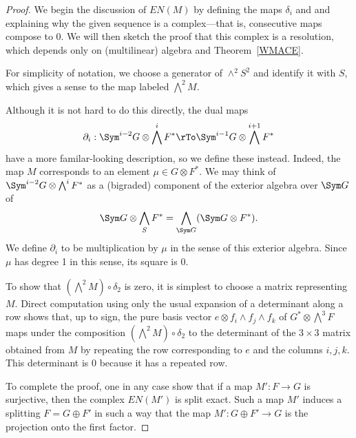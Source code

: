 \begin{proof} We begin the discussion of $EN(M)$ by defining the maps $\delta_i$ and and explaining why the given sequence is  a complex---that is, consecutive maps compose to 0. We will then sketch the proof that this complex is a resolution,
which depends only on (multilinear) algebra and Theorem~\ref{WMACE}. 

For simplicity of notation, we choose a generator of $\wedge^2 S^2$
 and identify it with $S$, which gives a sense to the map labeled $\bigwedge^2M$.
 
  Although it is not hard to do this directly, the dual maps
 $$
 \partial_i: \Sym^{i-2} G \otimes \bigwedge^i F^* \rTo \Sym^{i-1} G \otimes \bigwedge^{i+1} F^*
 $$
 have a more familar-looking description, so we define these instead. Indeed, the map $M$ corresponds to an
 element $\mu\in G\otimes F^*$. We may think of $ \Sym^{i-2} G \otimes \bigwedge^i  F^*$
 as a (bigraded) component of the exterior algebra over $ \Sym G$ of 
 $$
  \Sym G \otimes \bigwedge_S  F^*= \bigwedge_{ \Sym G} (\Sym G \otimes  F^*).
 $$
We define $\partial_i$ to be  multiplication by $\mu$ in the sense of this exterior algebra. Since $\mu$ has degree 1
in this sense, its square is 0. 

To show that $(\bigwedge^2 M)\circ \delta_2$ is zero, it is simplest to choose a matrix representing $M$.
Direct computation using only the usual expansion of a determinant
along a row shows that, up to sign, the
pure basis vector $e\otimes f_i\wedge f_j\wedge f_k$ of $G^*\otimes \bigwedge^3 F$
maps under the composition $(\bigwedge^2 M)\circ \delta_2$ to the determinant
of the $3\times 3$ matrix obtained from $M$ by repeating the row corresponding to $e$ and
the columns $i,j,k$. This determinant is 0 because it has a repeated row.

To complete the proof, one in any case show that 
if a map $M': F\to G$ is surjective, then the complex $EN(M')$
is split exact. Such a map $M'$ induces a splitting $F = G\oplus F'$ in such a way that the map $M': G\oplus F' \to G$ is the projection onto the first factor. 


\end{proof}
